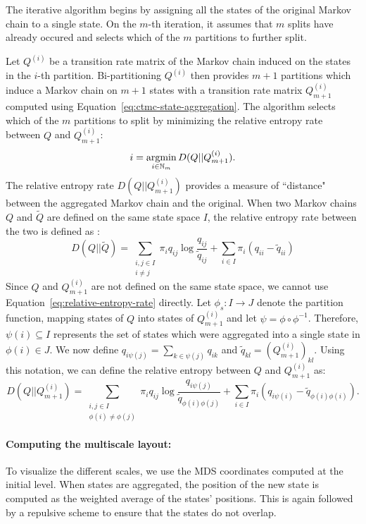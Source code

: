  The iterative algorithm begins by assigning  all the states of the original Markov chain to a single state. On the $m$-th iteration, it assumes that $m$ splits have already occured and selects which of the $m$ partitions to further split. 

 Let $Q^{(i)}$ be a transition rate matrix of the Markov chain induced on the states in the $i$-th partition. Bi-partitioning $Q^{(i)}$ then provides $m+1$ partitions which induce a Markov chain on $m+1$ states with a transition rate matrix $Q_{m+1}^{(i)}$ computed using Equation~\ref{eq:ctmc-state-aggregation}. The algorithm selects which of the $m$ partitions to split by minimizing the relative entropy rate between $Q$ and $Q_{m+1}^{(i)}$:
\begin{equation}
	i = \argmin\limits_{i \in \mathbb{N}_m} D(Q || Q_{m+1}^{(i)}).
\end{equation}
The relative entropy rate $D(Q || Q_{m+1}^{(i)})$ provides a measure of ``distance" between the aggregated Markov chain and the original. When two Markov chains $Q$ and $\tilde{Q}$ are defined on the same state space $I$, the relative entropy rate between the two is defined as \cite{EJP374}:
\begin{equation}
	\label{eq:relative-entropy-rate}
	D(Q || \tilde{Q}) = \sum\limits_{\substack{i,j \in I \\ i \neq j}}\pi_i q_{ij} \log\frac{q_{ij}}{\tilde{q}_{ij}} + \sum\limits_{i \in I}\pi_i(q_{ii} - \tilde{q}_{ii})
\end{equation}
Since $Q$ and $Q_{m+1}^{(i)}$ are not defined on the same state space, we cannot use Equation~\ref{eq:relative-entropy-rate} directly. Let $\phi_s: I \rightarrow J$ denote the partition function, mapping states of $Q$ into states of $Q_{m+1}^{(i)}$ and let $\psi = \phi \circ \phi^{-1}$. Therefore, $\psi(i) \subseteq I$  represents the set of states which were aggregated into a single state in $\phi(i) \in J$. We now define $q_{i\psi(j)} = \sum_{k \in \psi(j)}q_{ik}$ and $\tilde{q}_{kl} = \left(Q_{m+1}^{(i)}\right)_{kl}$. Using this notation, we can define the relative entropy between $Q$ and $Q_{m+1}^{(i)}$ as:
\begin{equation}
	D(Q || Q_{m+1}^{(i)}) = \sum\limits_{\substack{i,j \in I \\ \phi(i) \neq \phi(j)}}\pi_i q_{ij}\log\frac{q_{i\psi(j)}}{\tilde{q}_{\phi(i)\phi(j)}} + \sum\limits_{i \in I}\pi_i \left(q_{i\psi(i)} - \tilde{q}_{\phi(i)\phi(i)}\right).
\end{equation}

\paragraph{Computing the multiscale layout:}
To visualize the different scales, we use the MDS coordinates computed at the initial level. When states are aggregated, the position of the new state is computed as the weighted average of the states' positions. This is  again followed by a repulsive scheme to ensure that the states do not overlap.